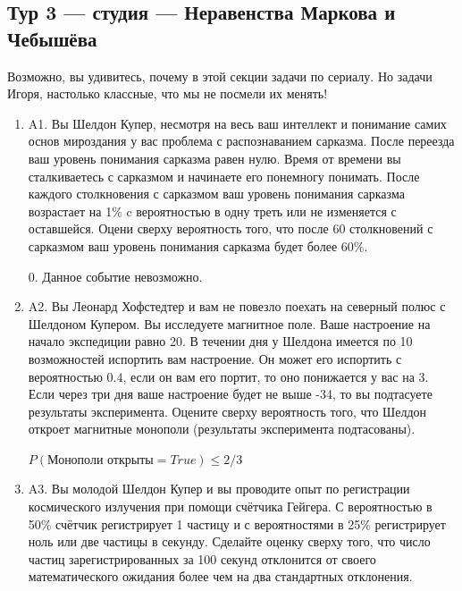 \documentclass[12pt]{article}
\def \P{P}
\newenvironment{problem}{}{}
\newenvironment{sol}{}{} %
\begin{document}
\newpage
\subsection{Тур 3 — студия — Неравенства Маркова и Чебышёва}

Возможно, вы удивитесь, почему в этой секции задачи по сериалу. Но задачи Игоря, настолько классные, что мы не посмели их менять!

\begin{enumerate}
\begin{problem}
\item[A1.] Вы Шелдон Купер, несмотря на весь ваш интеллект и понимание самих основ мироздания у вас проблема с распознаванием сарказма. После переезда ваш уровень понимания сарказма равен нулю. Время от времени вы сталкиваетесь с сарказмом и начинаете его понемногу понимать. После каждого столкновения с сарказмом ваш уровень понимания сарказма возрастает на 1\% c вероятностью в одну треть или не изменяется с оставшейся. Оцени сверху вероятность того, что после 60 столкновений с сарказмом ваш уровень понимания сарказма будет более 60\%.

\begin{sol}
$0$. Данное событие невозможно.
\end{sol}
\end{problem}

\begin{problem}
\item[A2.] Вы Леонард Хофстедтер и вам не повезло поехать на северный полюс с Шелдоном Купером. Вы исследуете магнитное поле. Ваше настроение на начало экспедиции равно 20. В течении дня у Шелдона имеется по 10 возможностей испортить вам настроение. Он может его испортить с вероятностью $0.4$, если он вам его портит, то оно понижается у вас на 3. Если через три дня ваше настроение будет не выше -34, то вы подтасуете результаты эксперимента. Оцените сверху вероятность того, что Шелдон откроет магнитные монополи (результаты эксперимента подтасованы). 

\begin{sol}
$\P(\text{Монополи открыты}=True) \leq 2/3 $ 
\end{sol}
\end{problem}

\begin{problem}
\item[A3.] Вы молодой Шелдон Купер и вы проводите опыт по регистрации космического излучения при помощи счётчика Гейгера. С вероятностью в 50\% счётчик регистрирует 1 частицу и с вероятностями в 25\% регистрирует ноль или две частицы в секунду. Сделайте оценку сверху того, что число частиц зарегистрированных за 100 секунд отклонится от своего математического ожидания более чем на два стандартных отклонения.


\end{problem}
\end{enumerate}
\end{document}
